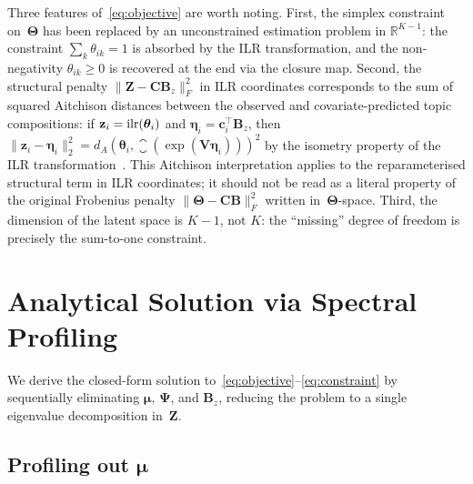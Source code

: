 \begin{remark}
\label{rem:what_reparam_achieves}
Three features of~\eqref{eq:objective} are worth noting.
%
First, the simplex constraint on~$\boldsymbol{\Theta}$ has been replaced
by an unconstrained estimation problem in $\mathbb{R}^{K-1}$: the
constraint $\sum_k\theta_{ik}=1$ is absorbed by the ILR transformation,
and the non-negativity $\theta_{ik}\geq 0$ is recovered at the end via
the closure map.
%
Second, the structural penalty
$\|\mathbf{Z}-\mathbf{C}\mathbf{B}_z\|_F^2$ in ILR coordinates
corresponds to the sum of squared Aitchison distances between the
observed and covariate-predicted topic compositions:
if $\mathbf{z}_i = \operatorname{ilr}(\boldsymbol{\theta}_i)$ and
$\boldsymbol{\eta}_i = \mathbf{c}_i^{\!\top}\mathbf{B}_z$, then
$\|\mathbf{z}_i - \boldsymbol{\eta}_i\|_2^2
 = d_A(\boldsymbol{\theta}_i,
       \closure(\exp(\mathbf{V}\boldsymbol{\eta}_i)))^2$
by the isometry property of the ILR
transformation~\citep{aitchison1986statistical}.
This Aitchison interpretation applies to the reparameterised
structural term in ILR coordinates; it should not be read as a literal
property of the original Frobenius penalty
$\|\boldsymbol{\Theta}-\mathbf{C}\mathbf{B}\|_F^2$ written
in~$\boldsymbol{\Theta}$-space.
%
Third, the dimension of the latent space is $K{-}1$, not $K$: the
``missing'' degree of freedom is precisely the sum-to-one constraint.
\end{remark}


\section{Analytical Solution via Spectral Profiling}
\label{sec:analytical}

We derive the closed-form solution
to~\eqref{eq:objective}--\eqref{eq:constraint} by sequentially
eliminating $\boldsymbol{\mu}$, $\boldsymbol{\Psi}$, and
$\mathbf{B}_z$, reducing the problem to a single eigenvalue
decomposition in~$\mathbf{Z}$.

\subsection{Profiling out
\texorpdfstring{$\boldsymbol{\mu}$}{μ}}
\label{subsec:profile_mu}

